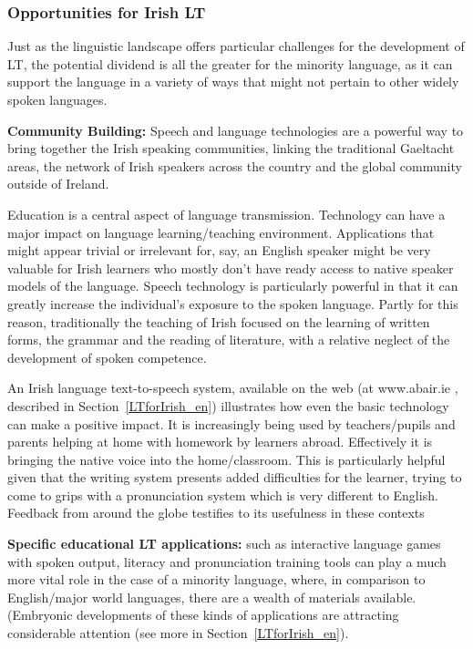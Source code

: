 \begin{multicols}{2}
\subsubsection{Opportunities for Irish LT}

Just as the linguistic landscape offers particular challenges for the development of LT, the potential dividend is all the greater for the minority language, as it can support the language in a variety of ways that might not pertain to other widely spoken languages. 

\textbf{Community Building:} Speech and language technologies are a powerful way to bring together the Irish speaking communities, linking the traditional Gaeltacht areas, the network of Irish speakers across the country and the global community outside of Ireland.

Education is a central aspect of language transmission. Technology can have a major impact on language learning/teaching environment. Applications that might appear trivial or irrelevant for, say, an English speaker might be very valuable for Irish learners who mostly don't have ready access to native speaker models of the language. Speech technology is particularly powerful in that it can greatly increase the individual's exposure to the spoken language. Partly for this reason, traditionally the teaching of Irish focused on the learning of written forms, the grammar and the reading of literature, with a relative neglect of the development of spoken competence. 

An Irish language text-to-speech system, available on the web (at www.abair.ie , described in Section~\ref{LTforIrish_en}) illustrates how even the basic technology can make a positive impact. It is increasingly being used by teachers/pupils and parents helping at home with homework by learners abroad. Effectively it is bringing the native voice into the home/classroom. This is particularly helpful given that the writing system presents added difficulties for the learner, trying to come to grips with a pronunciation system which is very different to English. Feedback from around the globe testifies to its usefulness in these contexts

\textbf{Specific educational LT applications:} such as interactive language games with spoken output, literacy and pronunciation training tools can play a much more vital role in the case of a minority language, where, in comparison to English/major world languages, there are a wealth of materials available. (Embryonic developments of these kinds of applications are attracting considerable attention (see more in Section~\ref{LTforIrish_en}).


\end{multicols}
